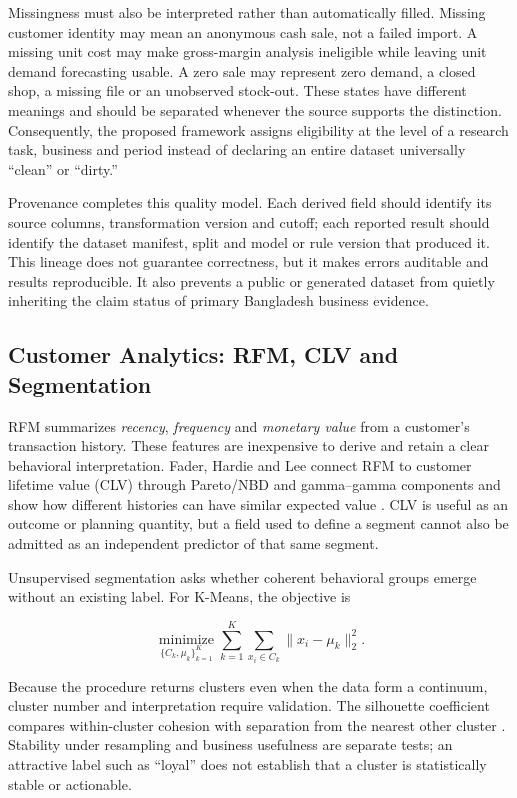 Missingness must also be interpreted rather than automatically filled. Missing
customer identity may mean an anonymous cash sale, not a failed import. A
missing unit cost may make gross-margin analysis ineligible while leaving unit
demand forecasting usable. A zero sale may represent zero demand, a closed
shop, a missing file or an unobserved stock-out. These states have different
meanings and should be separated whenever the source supports the distinction.
Consequently, the proposed framework assigns eligibility at the level of a
research task, business and period instead of declaring an entire dataset
universally ``clean'' or ``dirty.''

Provenance completes this quality model. Each derived field should identify its
source columns, transformation version and cutoff; each reported result should
identify the dataset manifest, split and model or rule version that produced
it. This lineage does not guarantee correctness, but it makes errors auditable
and results reproducible. It also prevents a public or generated dataset from
quietly inheriting the claim status of primary Bangladesh business evidence.

\subsection{Customer Analytics: RFM, CLV and Segmentation}

RFM summarizes \emph{recency}, \emph{frequency} and \emph{monetary value} from
a customer's transaction history. These features are inexpensive to derive and
retain a clear behavioral interpretation. Fader, Hardie and Lee connect RFM to
customer lifetime value (CLV) through Pareto/NBD and gamma--gamma components and
show how different histories can have similar expected value
\cite{fader2005rfm}. CLV is useful as an outcome or planning quantity, but a
field used to define a segment cannot also be admitted as an independent
predictor of that same segment.

Unsupervised segmentation asks whether coherent behavioral groups emerge
without an existing label. For K-Means, the objective is

\begin{equation}
  \underset{\{C_k,\mu_k\}_{k=1}^{K}}{\operatorname{minimize}}
  \sum_{k=1}^{K}\sum_{x_i\in C_k}\lVert x_i-\mu_k\rVert_2^2.
  \label{eq:kmeans}
\end{equation}

Because the procedure returns clusters even when the data form a continuum,
cluster number and interpretation require validation. The silhouette
coefficient compares within-cluster cohesion with separation from the nearest
other cluster \cite{rousseeuw1987silhouettes}. Stability under resampling and
business usefulness are separate tests; an attractive label such as ``loyal''
does not establish that a cluster is statistically stable or actionable.

